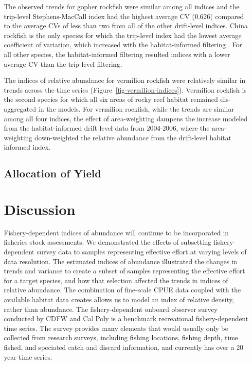 \documentclass[
  12pt,
  authoryear,
  preprint,
  3p]{elsarticle}
\begin{document}
The observed trends for gopher rockfish were similar among all indices
and the trip-level Stephens-MacCall index had the highest average CV
(0.626) compared to the average CVs of less than two from all of the
other drift-level indices. China rockfish is the only species for which
the trip-level index had the lowest average coefficient of variation,
which increased with the habitat-informed filtering . For all other
species, the habitat-informed filtering resulted indices with a lower
average CV than the trip-level filtering.

The indices of relative abundance for vermilion rockfish were relatively
similar in trends across the time series
(Figure~\ref{fig-vermilion-indices}). Vermilion rockfish is the second
species for which all six areas of rocky reef habitat remained
dis-aggregated in the models. For vermilion rockfish, while the trends
are similar among all four indices, the effect of area-weighting dampens
the increase modeled from the habitat-informed drift level data from
2004-2006, where the area-weighting down-weighted the relative abundance
from the drift-level habitat informed index.

\hypertarget{allocation-of-yield}{%
\subsection{Allocation of Yield}\label{allocation-of-yield}}

\FloatBarrier

\hypertarget{discussion}{%
\section{Discussion}\label{discussion}}

Fishery-dependent indices of abundance will continue to be incorporated
in fisheries stock assessments. We demonstrated the effects of
subsetting fishery-dependent survey data to samples representing
effective effort at varying levels of data resolution. The estimated
indices of abundance illustrated the changes in trends and variance to
create a subset of samples representing the effective effort for a
target species, and how that selection affected the trends in indices of
relative abundance. The combination of fine-scale CPUE data coupled with
the available habitat data creates allows us to model an index of
relative density, rather than abundance. The fishery-dependent onboard
observer survey conducted by CDFW and Cal Poly is a benchmark
recreational fishery-dependent time series. The survey provides many
elements that would usually only be collected from research surveys,
including fishing locations, fishing depth, time fished, and speciated
catch and discard information, and currently has over a 20 year time
series.
\end{document}
